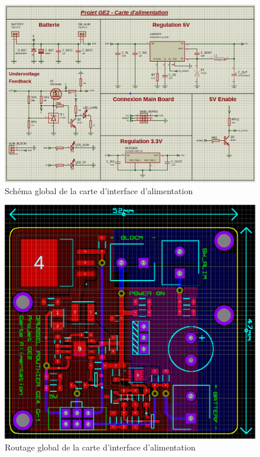 		\begin{landscape}
		
		\begin{figure}
			\begin{center}
				\includegraphics[scale=0.6]{../Illus/supply_gen_scheme.png}
			\end{center}
			\caption{Schéma global de la carte d'interface d'alimentation}
			\label{supply_gen_scheme}
		\end{figure}
		
		\newpage

		\begin{figure}
			\begin{center}
				\includegraphics[scale=0.55]{../Illus/supply_gen_routing.png}
			\end{center}
			\caption{Routage global de la carte d'interface d'alimentation}
			\label{supply_gen_routing}
		\end{figure}
		

\end{landscape}
